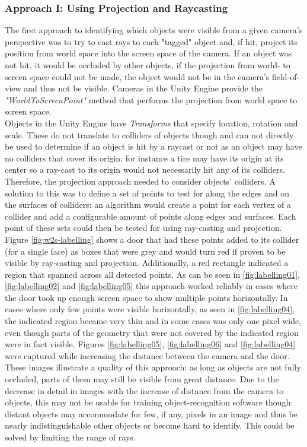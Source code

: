 \subsubsection{Approach I: Using Projection and Raycasting}
The first approach to identifying which objects were visible from a given camera's perspective was to try to cast rays to each "tagged" object and, if hit, project its position from world space into the screen space of the camera. If an object was not hit, it would be occluded by other objects, if the projection from world- to screen space could not be made, the object would not be in the camera's field-of-view and thus not be visible. Cameras in the Unity Engine provide the \textit{"WorldToScreenPoint"} \cite{UnityDocsCamera} method that performs the projection from world space to screen space.\\
Objects in the Unity Engine have \textit{Transforms} that specify location, rotation and scale. These do not translate to colliders of objects though and can not directly be used to determine if an object is hit by a raycast or not as an object may have no colliders that cover its origin: for instance a tire may have its origin at its center so a ray-cast to its origin would not necessarily hit any of its colliders. Therefore, the projection approach needed to consider objects' colliders. A solution to this was to define a set of points to test for along the edges and on the surfaces of colliders: an algorithm would create a point for each vertex of a collider and add a configurable amount of points along edges and surfaces. Each point of these sets could then be tested for using ray-casting and projection.\\
Figure \ref{fig:w2s-labelling} shows a door that had these points added to its collider (for a single face) as boxes that were grey and would turn red if proven to be visible by ray-casting and projection. Additionally, a red rectangle indicated a region that spanned across all detected points. As can be seen in \ref{fig:labelling01}, \ref{fig:labelling02} and \ref{fig:labelling05} this approach worked reliably in cases where the door took up enough screen space to show multiple points horizontally. In cases where only few points were visible horizontally, as seen in \ref{fig:labelling04}, the indicated region became very thin and in some cases was only one pixel wide, even though parts of the geometry that were not covered by the indicated region were in fact visible. Figures \ref{fig:labelling05}, \ref{fig:labelling06} and \ref{fig:labelling04} were captured while increasing the distance between the camera and the door. These images illustrate a quality of this approach: as long as objects are not fully occluded, parts of them may still be visible from great distance. Due to the decrease in detail in images with the increase of distance from the camera to objects, this may not be usable for training object-recognition software though: distant objects may accommodate for few, if any, pixels in an image and thus be nearly indistinguishable other objects or become hard to identify. This could be solved by limiting the range of rays.\\
